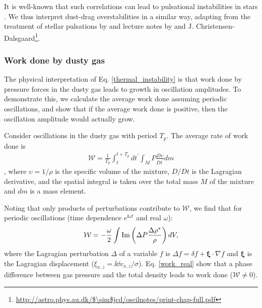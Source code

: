 It is well-known that such correlations can lead to pulsational
instabilities in stars \citep{cox67}. We thus interpret  
dust-drag overstabilities in a similar way, 
adapting from the treatment of stellar 
pulsations by \cite{cox67} and lecture notes by \cite{samadi15} and 
J. Christensen-Dalsgaard\footnote{\url{http://astro.phys.au.dk/$\sim$jcd/oscilnotes/print-chap-full.pdf}}.        
 


\subsubsection{Work done by dusty gas} 

The physical interpretation of Eq. \ref{thermal_instability} is that 
work done by pressure forces in the dusty gas leads to growth in
oscillation amplitudes. To demonstrate this, we calculate the average
work done assuming periodic oscillations, and show that if the average
work done is positive, then the 
oscillation amplitude would actually grow. 

Consider oscillations in the dusty gas with period $T_p$. 
The average rate of work done is 
\begin{align}
  \mathcal{W} = \frac{1}{T_p}\int^{t+T_p}_{t}dt^\prime\int_M P
  \frac{D\upsilon}{Dt^\prime} dm \label{work_def} 
\end{align}
\citep[][Eq. 4.10]{cox67}, 
where $\upsilon=1/\rho$ is the specific volume of the mixture, $D/Dt$
is the Lagragian derivative, and the 
spatial integral is taken over the total mass $M$ of the mixture and
$dm$ is a mass element. 

Noting that only products of perturbations contribute to
$\mathcal{W}$, we find that for periodic oscillations (time dependence 
$e^{\ii\omega t}$ and real $\omega$): 
\begin{align}
  \mathcal{W} = - \frac{\omega}{2} \int \operatorname{Im}\left(\Delta P
  \frac{\Delta \rho^*}{\rho}\right)dV,\label{work_real}
\end{align}
where %
 the Lagragian perturbation $\Delta$ of a variable $f$ is 
$\Delta f = \delta f + \bm{\xi}\cdot\nabla f$ and $\bm{\xi}$ is the
Lagragian displacement ($    \xi_{x,z} =  \ii \dd v_{x,z}/\sigma$).  
Eq. \ref{work_real} show that a phase difference between gas pressure and
the total density leads to work done
($\mathcal{W}\neq0$).  

